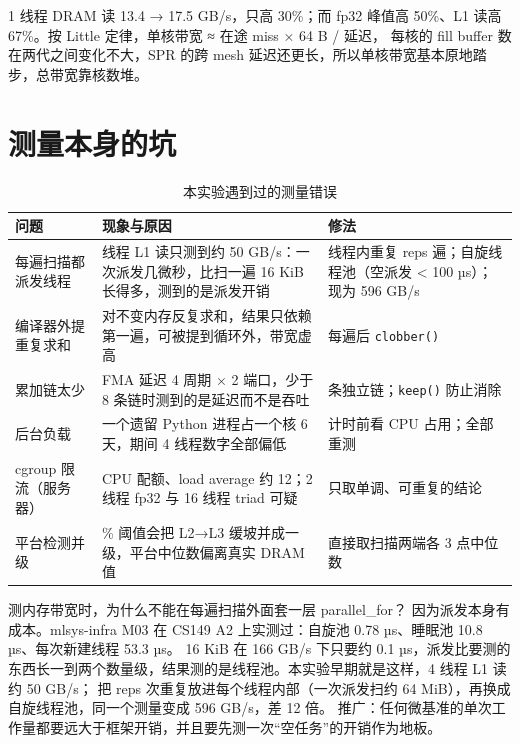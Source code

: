 \documentclass[11pt,a4paper]{ctexart}
\begin{document}
\begin{findingbox}
1 线程 DRAM 读 13.4 → 17.5 GB/s，只高 30\%；而 fp32 峰值高 50\%、L1 读高 67\%。按 Little 定律，单核带宽 ≈ 在途 miss × 64 B / 延迟，
每核的 fill buffer 数在两代之间变化不大，SPR 的跨 mesh 延迟还更长，所以单核带宽基本原地踏步，总带宽靠核数堆。
\end{findingbox}

\section{测量本身的坑}\label{sec:pitfalls}

\begin{table}[H]
\centering\small
\caption{本实验遇到过的测量错误}\label{tab:pitfalls}
\begin{tabularx}{\linewidth}{>{\raggedright\arraybackslash}p{3.4cm} >{\raggedright\arraybackslash}X >{\raggedright\arraybackslash}p{3.6cm}}
\toprule
问题 & 现象与原因 & 修法 \\
\midrule
每遍扫描都派发线程 & 4 线程 L1 读只测到约 50 GB/s：一次派发几微秒，比扫一遍 16 KiB 长得多，测到的是派发开销 & 线程内重复 reps 遍；自旋线程池（空派发 < 100 µs）；现为 596 GB/s \\
编译器外提重复求和 & 对不变内存反复求和，结果只依赖第一遍，可被提到循环外，带宽虚高 & 每遍后 \texttt{clobber()} \\
累加链太少 & FMA 延迟 4 周期 × 2 端口，少于 8 条链时测到的是延迟而不是吞吐 & 16 条独立链；\texttt{keep()} 防止消除 \\
后台负载 & 一个遗留 Python 进程占一个核 6 天，期间 4 线程数字全部偏低 & 计时前看 CPU 占用；全部重测 \\
cgroup 限流（服务器） & 22 CPU 配额、load average 约 12；2 线程 fp32 与 16 线程 triad 可疑 & 只取单调、可重复的结论 \\
平台检测并级 & 65\% 阈值会把 L2→L3 缓坡并成一级，平台中位数偏离真实 DRAM 值 & 直接取扫描两端各 3 点中位数 \\
\bottomrule
\end{tabularx}
\end{table}

\begin{iqbox}{测内存带宽时，为什么不能在每遍扫描外面套一层 parallel\_for？}
因为派发本身有成本。mlsys-infra M03 在 CS149 A2 上实测过：自旋池 0.78 µs、睡眠池 10.8 µs、每次新建线程 53.3 µs。
16 KiB 在 166 GB/s 下只要约 0.1 µs，派发比要测的东西长一到两个数量级，结果测的是线程池。本实验早期就是这样，4 线程 L1 读约 50 GB/s；
把 reps 次重复放进每个线程内部（一次派发扫约 64 MiB），再换成自旋线程池，同一个测量变成 596 GB/s，差 12 倍。
推广：任何微基准的单次工作量都要远大于框架开销，并且要先测一次“空任务”的开销作为地板。
\end{iqbox}
\end{document}

